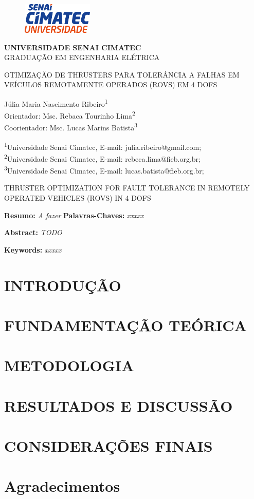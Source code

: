 \documentclass[12pt,a4paper]{article}
\makeatletter
\renewcommand\maketitle{
    \begin{figure}[ht]
        \centering
        \includegraphics[width=0.3\textwidth]{images/logotipo-SENAI-CIMATEC-Universidade-250 (1).png} 
    \end{figure}
    
    \begin{center}
        \textbf{\MakeUppercase{Universidade Senai Cimatec}}
        \\
        \MakeUppercase{Graduação em Engenharia Elétrica}
        
        \vspace{\baselineskip}
        
        \begin{large}
          \MakeUppercase{Otimização de thrusters para tolerância a falhas em veículos remotamente operados (ROVs) em 4 DOFs}
        \end{large}
    \end{center}

    \begin{flushright}
        Júlia Maria Nascimento Ribeiro\textsuperscript{1}\\
        Orientador: Msc. Rebaca Tourinho Lima\textsuperscript{2}\\
        Coorientador: Msc. Lucas Marins Batista\textsuperscript{3}\\
    \end{flushright}
    \begin{flushleft}
      \begin{small}
          \textsuperscript{1}Universidade Senai Cimatec, E-mail: julia.ribeiro@gmail.com;\\
          \textsuperscript{2}Universidade Senai Cimatec, E-mail: rebeca.lima@fieb.org.br;\\
          \textsuperscript{3}Universidade Senai Cimatec, E-mail: lucas.batista@fieb.org.br;\\
        \end{small}
      \end{flushleft}

      \begin{center}
        \begin{large}
          \MakeUppercase{Thruster Optimization for Fault Tolerance in Remotely Operated Vehicles (ROVs) in 4 DOFs}
        \end{large}
      \end{center}

    \noindent\textbf{Resumo:} 
    \textit{A fazer}
    \noindent\textbf{Palavras-Chaves:} 
      \textit{xxxxx}    

}
\newcommand\makeabstract{
  \noindent\textbf{Abstract:} 
    \textit{TODO}

  \vspace{0.4\baselineskip}

  \noindent\textbf{Keywords:} 
  \textit{xxxxx}

  \vspace{\baselineskip}
}
\makeatother
\begin{document}
    
    \maketitle
    \newpage
    \makeabstract

    \section{\MakeUppercase{Introdução}}
    \label{sec:intro}
    
    \FloatBarrier

    \section{\MakeUppercase{Fundamentação Teórica}}
    \label{sec:fundamentacao_teorica}
    
    \FloatBarrier

    \section{\MakeUppercase{Metodologia}}
    \label{sec:methodology}
    
    \FloatBarrier

    \section{\MakeUppercase{Resultados e Discussão}}
    \label{sec:results}
    
    \FloatBarrier

    \section{\MakeUppercase{Considerações finais}}
    \label{sec:conclusion}
    

    \section*{Agradecimentos}
    

\printbibliography
\end{document}
